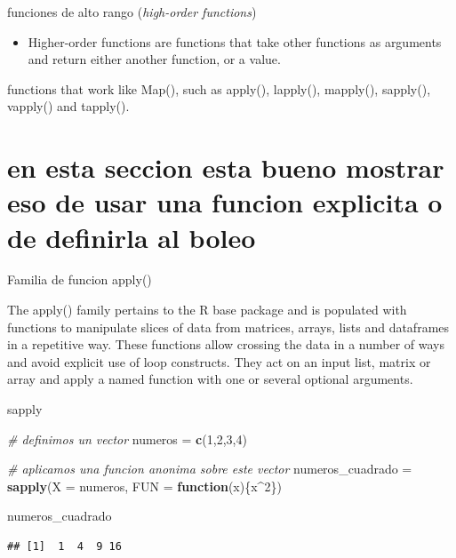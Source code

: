 \documentclass[ignorenonframetext,]{beamer}
\newenvironment{Shaded}{\begin{snugshade}}{\end{snugshade}}
\newcommand{\CommentTok}[1]{\textcolor[rgb]{0.56,0.35,0.01}{\textit{#1}}}
\newcommand{\ControlFlowTok}[1]{\textcolor[rgb]{0.13,0.29,0.53}{\textbf{#1}}}
\newcommand{\DataTypeTok}[1]{\textcolor[rgb]{0.13,0.29,0.53}{#1}}
\newcommand{\DecValTok}[1]{\textcolor[rgb]{0.00,0.00,0.81}{#1}}
\newcommand{\KeywordTok}[1]{\textcolor[rgb]{0.13,0.29,0.53}{\textbf{#1}}}
\newcommand{\NormalTok}[1]{#1}
\newcommand{\OperatorTok}[1]{\textcolor[rgb]{0.81,0.36,0.00}{\textbf{#1}}}
\newcommand{\StringTok}[1]{\textcolor[rgb]{0.31,0.60,0.02}{#1}}
\providecommand{\tightlist}{%
  \setlength{\itemsep}{0pt}\setlength{\parskip}{0pt}}
\begin{document}
\begin{frame}{funciones de alto rango (\emph{high-order functions})}
\protect\hypertarget{funciones-de-alto-rango-high-order-functions}{}

\begin{itemize}
\tightlist
\item
  Higher-order functions are functions that take other functions as
  arguments and return either another function, or a value.
\end{itemize}

functions that work like Map(), such as apply(), lapply(), mapply(),
sapply(), vapply() and tapply().

\end{frame}

\hypertarget{en-esta-seccion-esta-bueno-mostrar-eso-de-usar-una-funcion-explicita-o-de-definirla-al-boleo}{%
\section{en esta seccion esta bueno mostrar eso de usar una funcion
explicita o de definirla al
boleo}\label{en-esta-seccion-esta-bueno-mostrar-eso-de-usar-una-funcion-explicita-o-de-definirla-al-boleo}}

\begin{frame}{Familia de funcion apply()}
\protect\hypertarget{familia-de-funcion-apply}{}

The apply() family pertains to the R base package and is populated with
functions to manipulate slices of data from matrices, arrays, lists and
dataframes in a repetitive way. These functions allow crossing the data
in a number of ways and avoid explicit use of loop constructs. They act
on an input list, matrix or array and apply a named function with one or
several optional arguments.

\end{frame}

\begin{frame}[fragile]{sapply}
\protect\hypertarget{sapply}{}

\begin{Shaded}
\begin{Highlighting}[]
\CommentTok{# definimos un vector}
\NormalTok{numeros =}\StringTok{ }\KeywordTok{c}\NormalTok{(}\DecValTok{1}\NormalTok{,}\DecValTok{2}\NormalTok{,}\DecValTok{3}\NormalTok{,}\DecValTok{4}\NormalTok{)}

\CommentTok{# aplicamos una funcion anonima sobre este vector}
\NormalTok{numeros_cuadrado =}\StringTok{ }\KeywordTok{sapply}\NormalTok{(}\DataTypeTok{X =}\NormalTok{ numeros, }\DataTypeTok{FUN =} \ControlFlowTok{function}\NormalTok{(x)\{x}\OperatorTok{^}\DecValTok{2}\NormalTok{\})}

\NormalTok{numeros_cuadrado}
\end{Highlighting}
\end{Shaded}

\begin{verbatim}
## [1]  1  4  9 16
\end{verbatim}

\end{frame}
\end{document}

